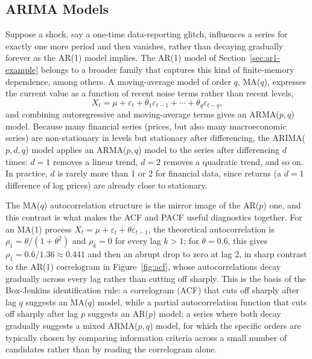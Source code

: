 \documentclass[../ai_in_finance]{subfiles}
\begin{document}
\subsection{ARIMA Models}

Suppose a shock, say a one-time data-reporting glitch, influences a series for exactly one more period and then vanishes, rather than decaying gradually forever as the AR(1) model implies. The AR(1) model of Section~\ref{sec:ar1-example} belongs to a broader family that captures this kind of finite-memory dependence, among others. A moving-average model of order $q$, MA($q$), expresses the current value as a function of recent noise terms rather than recent levels,
\begin{equation*}
X_t = \mu + \varepsilon_t + \theta_1 \varepsilon_{t-1} + \cdots + \theta_q \varepsilon_{t-q},
\end{equation*}
and combining autoregressive and moving-average terms gives an ARMA($p,q$) model. Because many financial series (prices, but also many macroeconomic series)
are non-stationary in levels
but stationary after differencing, the ARIMA($p,d,q$) model applies an ARMA($p,q$) model to the series after
differencing $d$ times: $d=1$ removes a linear trend, $d=2$ removes a quadratic trend, and so on. In practice, $d$ is rarely more than 1 or 2 for financial data,
since returns (a $d=1$ difference of log prices) are already close to stationary.

The MA($q$) autocorrelation structure is the mirror image of the AR($p$) one, and this
contrast is what makes the ACF and PACF useful diagnostics together. For an MA(1) process $X_t = \mu + \varepsilon_t + \theta \varepsilon_{t-1}$,
the theoretical autocorrelation is $\rho_1 = \theta/(1+\theta^2)$ and $\rho_k=0$ for every lag $k>1$; for $\theta=0.6$, this gives $\rho_1 = 0.6/1.36 \approx 0.441$ and
then an abrupt drop to zero at lag 2, in sharp contrast to the AR(1) correlogram in Figure~\ref{fig:acf}, whose autocorrelations decay gradually across every lag
rather than cutting off sharply. This is the basis of the Box-Jenkins identification rule: a correlogram (ACF) that cuts off sharply after lag $q$ suggests an
MA($q$) model, while a partial autocorrelation function that cuts off sharply after lag $p$ suggests an AR($p$) model; a series where both decay gradually
suggests a mixed ARMA($p,q$) model, for which the specific orders are typically chosen by comparing information criteria across a small number of candidates
 rather than by reading the correlogram alone.
\end{document}
